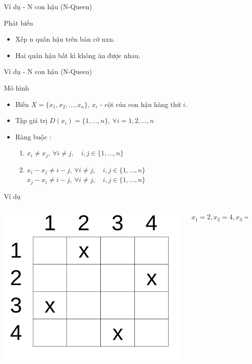 \documentclass[compress]{beamer}
\begin{document}
\begin{frame}{Ví dụ - N con hậu (N-Queen)}
\begin{exampleblock}{Phát biểu}
\begin{itemize}
\item Xếp n quân hậu trên bàn cờ nxn.
\item Hai quân hậu bất kì không ăn được nhau. 
\end{itemize}
\end{exampleblock}
\end{frame}
\begin{frame}{Ví dụ - N con hậu (N-Queen)}
\begin{block}{Mô hình}
\begin{itemize}
\item Biến $X=\{x_1, x_2, \dots,x_n\}$, $x_i$ - cột của con hậu hàng thứ $i$.
\item Tập giá trị $D(x_i)=\{1,\ldots,n\}, \ \forall i=1,2,\dots,n$
\item Ràng buộc :
\begin{enumerate}


\item 
$ x_i \neq x_j, \ \forall i \neq j, \quad i,j \in \{1,\dots,n\} $
\item 
$x_i-x_j \neq i-j , \ \forall i \neq j, \quad i,j \in \{1,\dots,n\}$
$x_j-x_i \neq i-j, \ \forall i \neq j, \quad i,j \in \{1,\dots,n\}$
\end{enumerate}
\end{itemize}
\end{block}
\begin{exampleblock}{Ví dụ}

\begin{columns}
\begin{column}{0.3\textwidth}
  \includegraphics[scale=0.2]{n-queen.png}
\end{column}
\begin{column}{0.7\textwidth}  
     $$x_1=2,x_2=4,x_3=1,x_4=3$$
\end{column}
\end{columns}
\end{exampleblock}
\end{frame}
\end{document}
